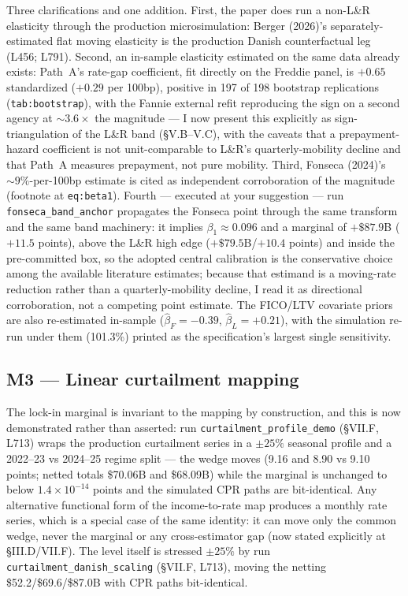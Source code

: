 \documentclass[11pt]{article}
\newcommand{\mlabel}[1]{\texttt{#1}}
\newcommand{\run}[1]{\texttt{#1}}
\begin{document}
Three clarifications and one addition. First, the paper does run a non-L\&R
elasticity through the production microsimulation: Berger (2026)'s
separately-estimated flat moving elasticity is the production Danish
counterfactual leg (L456; L791). Second, an in-sample elasticity estimated on
the same data already exists: Path~A's rate-gap coefficient, fit directly on
the Freddie panel, is $+0.65$ standardized ($+0.29$ per 100bp), positive in
197 of 198 bootstrap replications (\mlabel{tab:bootstrap}), with the Fannie
external refit reproducing the sign on a second agency at ${\sim}3.6\times$
the magnitude --- I now present this explicitly as sign-triangulation of the
L\&R band (\S V.B--V.C), with the caveats that a prepayment-hazard coefficient
is not unit-comparable to L\&R's quarterly-mobility decline and that Path~A
measures prepayment, not pure mobility. Third, Fonseca (2024)'s
${\sim}9\%$-per-100bp estimate is cited as independent corroboration of the
magnitude (footnote at \mlabel{eq:beta1}). Fourth --- executed at your
suggestion --- run \run{fonseca\_band\_anchor} propagates the Fonseca point
through the same transform and the same band machinery: it implies
$\beta_1 \approx 0.096$ and a marginal of $+\$87.9$B ($+11.5$ points), above
the L\&R high edge ($+\$79.5$B/$+10.4$ points) and inside the pre-committed
box, so the adopted central calibration is the conservative choice among the
available literature estimates; because that estimand is a moving-rate
reduction rather than a quarterly-mobility decline, I read it as directional
corroboration, not a competing point estimate. The FICO/LTV covariate priors
are also re-estimated in-sample ($\hat\beta_F = -0.39$, $\hat\beta_L = +0.21$),
with the simulation re-run under them (101.3\%) printed as the specification's
largest single sensitivity.

\subsection*{M3 --- Linear curtailment mapping}

The lock-in marginal is invariant to the mapping by construction, and this is
now demonstrated rather than asserted: run \run{curtailment\_profile\_demo}
(\S VII.F, L713) wraps the production curtailment series in a $\pm 25\%$
seasonal profile and a 2022--23 vs 2024--25 regime split --- the wedge moves
(9.16 and 8.90 vs 9.10 points; netted totals \$70.06B and \$68.09B) while the
marginal is unchanged to below $1.4\times10^{-14}$ points and the simulated
CPR paths are bit-identical. Any alternative functional form of the
income-to-rate map produces a monthly rate series, which is a special case of
the same identity: it can move only the common wedge, never the marginal or
any cross-estimator gap (now stated explicitly at \S III.D/VII.F). The level
itself is stressed $\pm 25\%$ by run \run{curtailment\_danish\_scaling}
(\S VII.F, L713), moving the netting \$52.2/\$69.6/\$87.0B with CPR paths
bit-identical.
\end{document}
